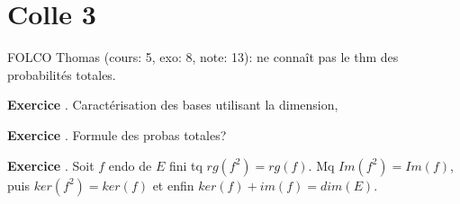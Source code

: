 \documentclass[10pt,a4paper]{article}
\newcounter{question}
\newcounter{exo}
\newenvironment{exo}{\vspace{0.5cm}\setcounter{question}{0}\addtocounter{exo}{1} \noindent \textbf{Exercice \theexo}. \normalsize }{\par}
\begin{document}
	\section*{Colle 3}
	\setcounter{exo}{0}
	FOLCO Thomas (cours: 5, exo: 8, note: 13): ne connaît pas le thm des probabilités totales.\\
	
	\begin{exo}
		  Caractérisation des bases utilisant la dimension,
	\end{exo}		
	
	\begin{exo}
		Formule des probas totales?
	\end{exo}

	\begin{exo}
		Soit $f$ endo de $E$ fini tq $rg(f^2) = rg(f)$. Mq $Im(f^2) = Im(f)$, puis $ker(f^2) = ker(f)$ et enfin $ker(f) + im(f) = dim(E)$.
	\end{exo}
	
\end{document}
